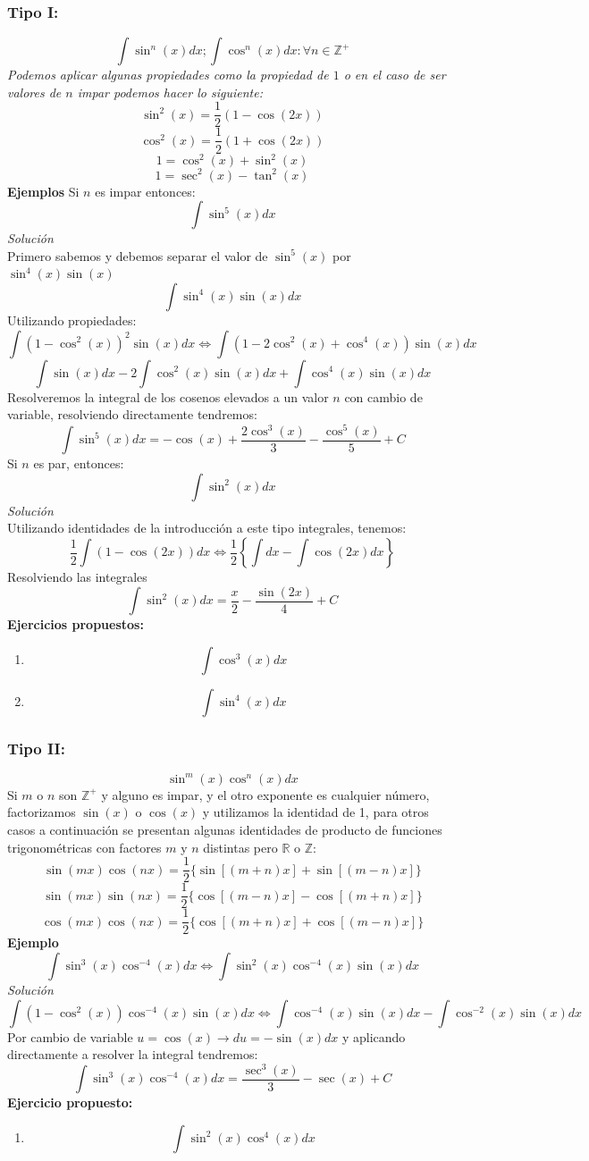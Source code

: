 \documentclass[10pt]{article}
\begin{document}
\subsubsection{Tipo I:}
\[\int\sin^{n}(x)dx;\int\cos^{n}(x)dx\colon\forall n\in\mathbb{Z^{+}}\]
\textit{Podemos aplicar algunas propiedades como la propiedad de $1$ o en el caso de ser valores de $n$ impar podemos hacer lo siguiente:}
\[\sin^{2}(x)=\frac{1}{2}(1-\cos(2x))\]
\[\cos^{2}(x)=\frac{1}{2}(1+\cos(2x))\]
\[1=\cos^{2}(x)+\sin^{2}(x)\]
\[1=\sec^{2}(x)-\tan^{2}(x)\]
\textbf{Ejemplos}
Si $n$ es impar entonces:
\[\int \sin^{5}(x)dx\]
\textit{Solución}
\\
Primero sabemos y debemos separar el valor de $\sin^{5}(x)$ por $\sin^{4}(x)\sin(x)$
\[\int\sin^{4}(x)\sin(x)dx\]
Utilizando propiedades:
\[\int(1-\cos^{2}(x))^{2}\sin(x)dx \Leftrightarrow \int(1-2\cos^{2}(x)+\cos^{4}(x))\sin(x)dx\]
\[\int\sin(x)dx - 2\int\cos^{2}(x)\sin(x)dx + \int\cos^{4}(x)\sin(x)dx\]
Resolveremos la integral de los cosenos elevados a un valor $n$ con cambio de variable, resolviendo directamente tendremos:
\[\int \sin^{5}(x)dx=-\cos(x)+\frac{2\cos^3(x)}{3}-\frac{\cos^{5}(x)}{5}+C\]
\vspace{0.75cm}
Si $n$ es par, entonces:
\[\int\sin^{2}(x)dx\]
\textit{Solución}\\
Utilizando identidades de la introducción a este tipo integrales, tenemos:
\[\frac{1}{2}\int(1-\cos(2x))dx \Leftrightarrow \frac{1}{2}\left\{\int dx - \int\cos(2x)dx\right\}\]
Resolviendo las integrales
\[\int\sin^{2}(x)dx=\frac{x}{2}-\frac{\sin(2x)}{4}+C\]
\clearpage
\textbf{Ejercicios propuestos:}
\begin{enumerate}
  \item \[\int\cos^{3}(x)dx\]
  \item \[\int\sin^{4}(x)dx\]
\end{enumerate}


\subsubsection{Tipo II:}
\[\sin^{m}(x)\cos^{n}(x)dx\]
Si $m$ o $n$ son $\mathbb{Z^{+}}$ y alguno es impar, y el otro exponente es cualquier número, factorizamos $\sin(x)$ o $\cos(x)$ y utilizamos la identidad de 1, para otros casos a continuación se presentan algunas identidades de producto de funciones trigonométricas con factores $m$ y $n$ distintas pero $\mathbb{R}$ o $\mathbb{Z}$:
\[\sin(mx)\cos(nx)=\frac{1}{2}\{\sin[(m+n)x]+\sin[(m-n)x]\}\]
\[\sin(mx)\sin(nx)=\frac{1}{2}\{\cos[(m-n)x]-\cos[(m+n)x]\}\]
\[\cos(mx)\cos(nx)=\frac{1}{2}\{\cos[(m+n)x]+\cos[(m-n)x]\}\]
\textbf{Ejemplo}
\[\int\sin^{3}(x)\cos^{-4}(x)dx \Leftrightarrow \int\sin^{2}(x)\cos^{-4}(x)\sin(x)dx\]
\textit{Solución}
\[\int(1-\cos^{2}(x))\cos^{-4}(x)\sin(x)dx \Leftrightarrow \int\cos^{-4}(x)\sin(x)dx - \int\cos^{-2}(x)\sin(x)dx\]
Por cambio de variable $u=\cos(x) \rightarrow du=-\sin(x)dx$ y aplicando directamente a resolver la integral tendremos:
\[\int\sin^{3}(x)\cos^{-4}(x)dx = \frac{\sec^{3}(x)}{3}-\sec(x) +C\]
\textbf{Ejercicio propuesto:}
\begin{enumerate}
  \item \[\int\sin^{2}(x)\cos^{4}(x)dx\]
\end{enumerate}
\clearpage
\end{document}
